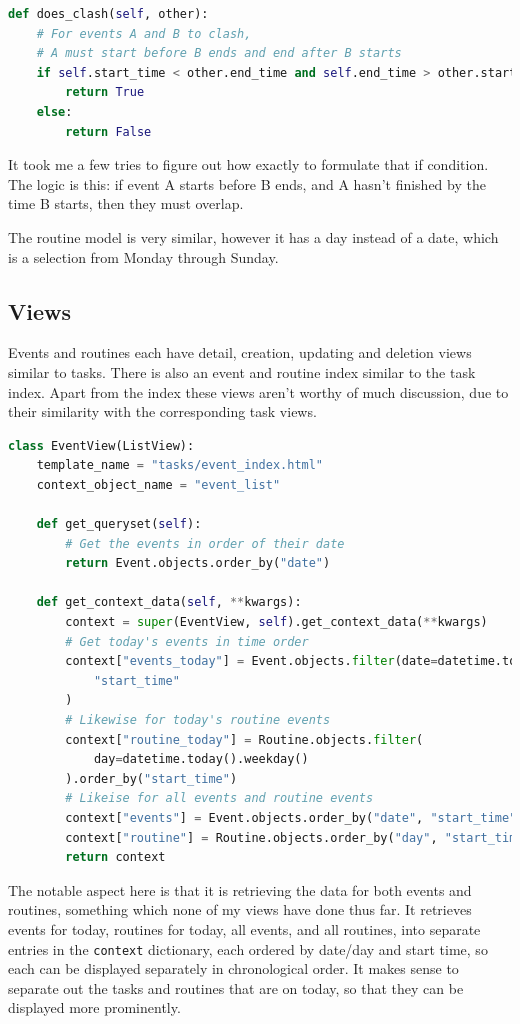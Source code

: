 \documentclass{article}
\begin{document}
\begin{lstlisting}[language=Python]
def does_clash(self, other):
    # For events A and B to clash,
    # A must start before B ends and end after B starts
    if self.start_time < other.end_time and self.end_time > other.start_time:
        return True
    else:
        return False
\end{lstlisting}

It took me a few tries to figure out how exactly to formulate that if condition.
The logic is this:
if event A starts before B ends,
and A hasn't finished by the time B starts,
then they must overlap.

The routine model is very similar,
however it has a day instead of a date,
which is a selection from Monday through Sunday.

\subsection{Views}
Events and routines each have detail, creation, updating and deletion views similar to tasks.
There is also an event and routine index similar to the task index.
Apart from the index these views aren't worthy of much discussion,
due to their similarity with the corresponding task views.

\begin{lstlisting}[language=Python]
class EventView(ListView):
    template_name = "tasks/event_index.html"
    context_object_name = "event_list"

    def get_queryset(self):
        # Get the events in order of their date
        return Event.objects.order_by("date")

    def get_context_data(self, **kwargs):
        context = super(EventView, self).get_context_data(**kwargs)
        # Get today's events in time order
        context["events_today"] = Event.objects.filter(date=datetime.today()).order_by(
            "start_time"
        )
        # Likewise for today's routine events
        context["routine_today"] = Routine.objects.filter(
            day=datetime.today().weekday()
        ).order_by("start_time")
        # Likeise for all events and routine events
        context["events"] = Event.objects.order_by("date", "start_time")
        context["routine"] = Routine.objects.order_by("day", "start_time")
        return context
\end{lstlisting}

The notable aspect here is that it is retrieving the data for both events and routines,
something which none of my views have done thus far.
It retrieves events for today,
routines for today,
all events,
and all routines,
into separate entries in the \texttt{context} dictionary,
each ordered by date/day and start time,
so each can be displayed separately in chronological order.
It makes sense to separate out the tasks and routines that are on today,
so that they can be displayed more prominently.
\end{document}
